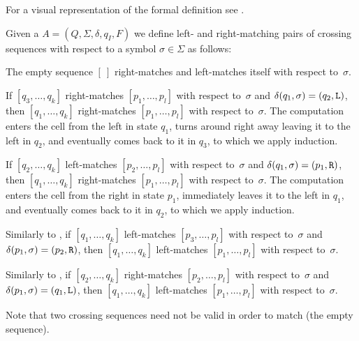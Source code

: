 For a visual representation of the formal definition see .
\begin{defn}
	Given a \TDFA $A=(Q,\Sigma,\delta,q_I,F)$ we define left- and right-matching pairs of crossing sequences with respect to a symbol $\sigma\in\Sigma$ as follows:
	\begin{rules}
		\item \label{itm:crossmatch2DFA-1} The empty sequence $[~]$ right-matches and left-matches itself with respect to~$\sigma$.
		\item \label{itm:crossmatch2DFA-2} If $[q_3,\dots,q_k]$ right-matches $[p_1,\dots,p_l]$ with respect to~$\sigma$ and $\delta(q_1,\sigma)=(q_2,\mathtt L)$, then $[q_1,\dots,q_k]$ right-matches $[p_1,\dots,p_l]$ with respect to~$\sigma$.
		The computation enters the cell from the left in state $q_1$, turns around right away leaving it to the left in $q_2$, and eventually comes back to it in $q_3$, to which we apply induction.
		\item \label{itm:crossmatch2DFA-3} If $[q_2,\dots,q_k]$ left-matches $[p_2,\dots,p_l]$ with respect to~$\sigma$ and $\delta(q_1,\sigma)=(p_1,\mathtt R)$, then $[q_1,\dots,q_k]$ right-matches $[p_1,\dots,p_l]$ with respect to~$\sigma$.
		The computation enters the cell from the right in state $p_1$, immediately leaves it to the left in $q_1$, and eventually comes back to it in $q_2$, to which we apply induction.
		\item \label{itm:crossmatch2DFA-4} Similarly to , if $[q_1,\dots,q_k]$ left-matches $[p_3,\dots,p_l]$ with respect to~$\sigma$ and $\delta(p_1,\sigma)=(p_2,\mathtt R)$, then $[q_1,\dots,q_k]$ left-matches $[p_1,\dots,p_l]$ with respect to~$\sigma$.
		\item \label{itm:crossmatch2DFA-5} Similarly to , if $[q_2,\dots,q_k]$ right-matches $[p_2,\dots,p_l]$ with respect to~$\sigma$ and $\delta(p_1,\sigma)=(q_1,\mathtt L)$, then $[q_1,\dots,q_k]$ left-matches $[p_1,\dots,p_l]$ with respect to~$\sigma$.
	\end{rules}
\end{defn}
Note that two crossing sequences need not be valid in order to match (\eg the empty sequence).

